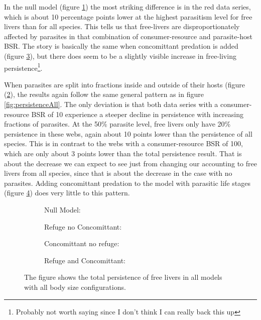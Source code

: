 \documentclass[11pt]{amsart}
\begin{document}
In the null model (figure \ref{fig:persistenceFreea}) the most striking difference is in the red data series, which is about 10 percentage points lower at the highest parasitism level for free livers than for all species.  This tells us that free-livers are disproportionately affected by parasites in that combination of consumer-resource and parasite-host BSR.  The story is basically the same when concomittant predation is added (figure \ref{fig:persistenceFreec}), but there does seem to be a slightly visible increase in free-living persistence\footnote{Probably not worth saying since I don't think I can really back this up}.   

When parasites are split into fractions inside and outside of their hosts (figure (\ref{fig:persistenceFreeb}), the results again follow the same general pattern as in figure \ref{fig:persistenceAll}.  The only deviation is that both data series with a consumer-resource BSR of 10 experience a steeper decline in persistence with increasing fractions of parasites.  At the 50\% parasite level, free livers only have 20\% persistence in these webs, again about 10 points lower than the persistence of all species. This is in contrast to the webs with a consumer-resource BSR of 100, which are only about 3 points lower than the total persistence result.  That is about the decrease we can expect to see just from changing our accounting to free livers from all species, since that is about the decrease in the case with no parasites.  Adding concomittant predation to the model with parasitic life stages (figure \ref{fig:persistenceFreed}) does very little to this pattern. 

\begin{figure}[h]
\begin{subfigure}[t]{.45\textwidth}
\caption{Null Model:\label{fig:persistenceFreea}}
\end{subfigure}
\begin{subfigure}[t]{.45\textwidth}
\caption{Refuge no Concomittant:\label{fig:persistenceFreeb}}
\end{subfigure}

\begin{subfigure}[ct]{.45\textwidth}
\caption{Concomittant no refuge:\label{fig:persistenceFreec}}
\end{subfigure}
\begin{subfigure}[ct]{.45\textwidth}
\caption{Refuge and Concomittant:\label{fig:persistenceFreed}}
\end{subfigure}
\caption{The figure shows the total persistence of free livers in all models with all body size configurations.}
\label{fig:persistenceFree}
\end{figure}
\end{document}
